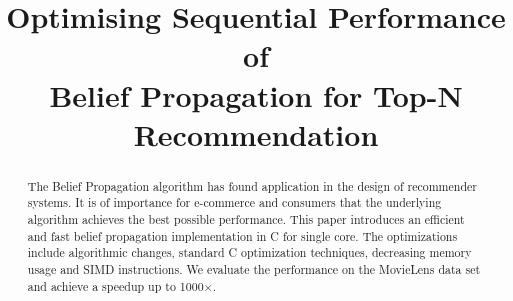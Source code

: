 \documentclass[letterpaper]{article}
\title{Optimising Sequential Performance of\\ Belief Propagation for Top-N Recommendation}
\begin{document}
%
\maketitle
%


\begin{abstract}

The Belief Propagation algorithm has found application in the design of recommender systems. It is of importance for e-commerce and consumers that the underlying algorithm achieves the best possible performance. This paper introduces an efficient and fast belief propagation implementation in C for single core. The optimizations include algorithmic changes, standard C optimization techniques, decreasing memory usage and SIMD instructions. We evaluate the performance on the MovieLens data set and achieve a speedup up to 1000$\times$.
\end{abstract}
\end{document}
